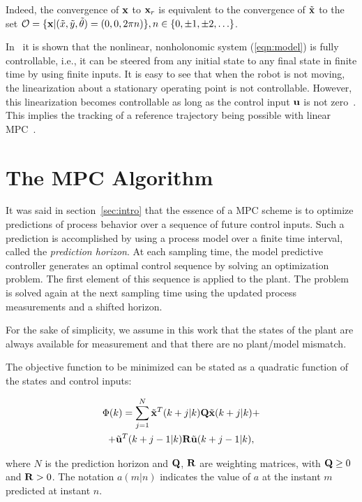 \documentclass[conference]{IEEEtran} %
\begin{document}
Indeed, the convergence of ${\bf x}$ to ${\bf x}_r$ is equivalent to the
convergence of $\tilde{\bf x}$ to the set ${\cal O}=\{{\bf x}|(\tilde
x,\tilde y,\tilde\theta)=(0,0,2\pi n)\},n\in \{0,\pm1,\pm2,\ldots\}$.

In~\cite{bloch89} it is shown that the nonlinear, nonholonomic system
(\ref{eqn:model}) is fully controllable, i.e., it can be steered from any
initial state to any final state in finite time by using finite inputs. It
is easy to see that when the robot is not moving, the linearization about a
stationary operating point is not controllable. However, this linearization
becomes controllable as long as the control input ${\bf u}$ is not
zero~\cite{samson91}. This implies the tracking of a reference trajectory
being possible with linear MPC~\cite{essen01}.


\section{The MPC Algorithm}
\label{sec:mpc}

It was said in section~\ref{sec:intro} that the essence of a MPC scheme is
to optimize predictions of process behavior over a sequence of future control inputs. Such
a prediction is accomplished by using a process model over a finite time
interval, called the {\em prediction horizon}. At each sampling time, the
model predictive controller generates an optimal control sequence by solving
an optimization problem. The first element of this sequence is applied to the
plant. The problem is solved again at the next sampling time using the
updated process measurements and a shifted horizon.

For the sake of simplicity, we assume in this work that the states of the
plant are always available for measurement and that there are no plant/model
mismatch.

The objective function to be minimized can be stated as a quadratic function of
the states and control inputs:

\begin{multline}
\label{eqn:cost}
	\Phi(k) = \sum_{j=1}^{N}\tilde{\bf x}^T(k+j|k){\bf Q}\tilde{\bf x}(k+j|k) + \\ + \tilde{\bf u}^T(k+j-1|k){\bf R}\tilde{\bf u}(k+j-1|k),
\end{multline}

\noindent where $N$ is the prediction horizon and ${\bf Q}$, ${\bf R}$ are
weighting matrices, with ${\bf Q}\geq 0$ and ${\bf R}>0$. The notation
$a(m|n)$ indicates the value of $a$ at the instant $m$ predicted at instant
$n$.
\end{document}
